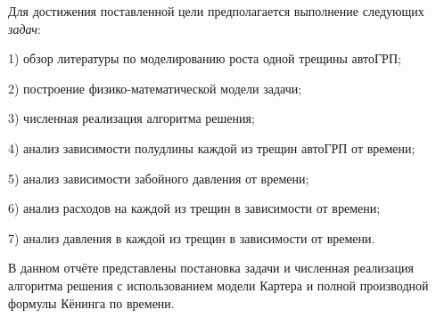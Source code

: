 Для достижения поставленной цели предполагается выполнение следующих \emph{задач}:

1) обзор литературы по моделированию роста одной трещины автоГРП;

2) построение физико-математической модели задачи;

3) численная реализация алгоритма решения;

4) анализ зависимости полудлины каждой из трещин автоГРП от времени;

5) анализ зависимости забойного давления от времени;

6) анализ расходов на каждой из трещин в зависимости от времени;

7) анализ давления в каждой из трещин в зависимости от времени.

В данном отчёте представлены постановка задачи и численная реализация алгоритма решения с использованием модели Картера \cite{karter_book} и полной производной формулы Кёнинга \cite{koning_book} по времени.
